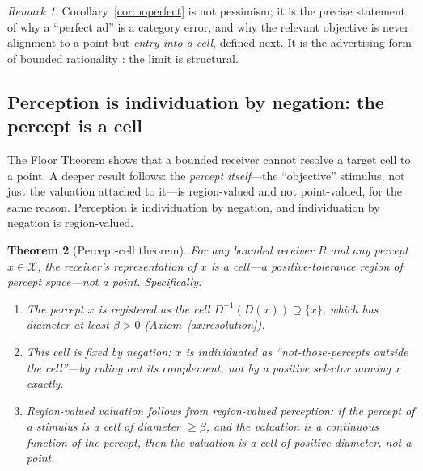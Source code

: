 \documentclass[twocolumn,11pt,a4paper]{article}
\theoremstyle{adv}
\newtheorem{theorem}{Theorem}[section]
\theoremstyle{definition}
\theoremstyle{remark}
\newtheorem{remark}[theorem]{Remark}
\newcommand{\Out}{\mathcal{X}}         %
\newcommand{\Dec}{D}                   %
\newcommand{\Recv}{R}                  %
\newcommand{\floor}{\beta}            %
\begin{document}
\begin{remark}
Corollary~\ref{cor:noperfect} is not pessimism; it is the precise
statement of why a ``perfect ad'' is a category error, and why the
relevant objective is never alignment to a point but \emph{entry into a
cell}, defined next. It is the advertising form of bounded rationality
\citep{simon1955,simon1956,gigerenzer1996}: the limit is structural.
\end{remark}

\subsection{Perception is individuation by negation: the percept is a cell}

The Floor Theorem shows that a bounded receiver cannot resolve a target cell
to a point. A deeper result follows: the \emph{percept itself}---the
``objective'' stimulus, not just the valuation attached to it---is
region-valued and not point-valued, for the same reason. Perception is
individuation by negation, and individuation by negation is region-valued.

\begin{theorem}[Percept-cell theorem]
\label{thm:percept-cell}
For any bounded receiver $\Recv$ and any percept $x\in\Out$, the receiver's
representation of $x$ is a cell---a positive-tolerance region of percept
space---not a point. Specifically:
\begin{enumerate}[label=\textup{(\roman*)},leftmargin=2.2em]
\item The percept $x$ is registered as the cell $\Dec^{-1}(\Dec(x))
      \supseteq\{x\}$, which has diameter at least $\floor>0$
      (Axiom~\ref{ax:resolution}).
\item This cell is fixed by negation: $x$ is individuated as ``not-those-percepts
      outside the cell''---by ruling out its complement, not by a positive
      selector naming $x$ exactly.
\item Region-valued valuation follows from region-valued perception: if
      the percept of a stimulus is a cell of diameter $\ge\floor$, and the
      valuation is a continuous function of the percept, then the valuation
      is a cell of positive diameter, not a point.
\end{enumerate}
\end{theorem}
\end{document}
